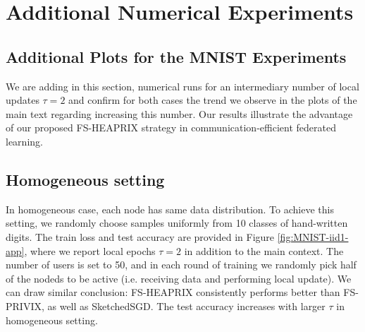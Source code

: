 \documentclass[twoside]{article}
\begin{document}
\section{Additional Numerical Experiments}

\subsection{Additional Plots for the MNIST Experiments}
We are adding in this section, numerical runs for an intermediary number of local updates $\tau =2$ and confirm for both cases the trend we observe in the plots of the main text regarding increasing this number. Our results illustrate the advantage of our proposed FS-HEAPRIX strategy in communication-efficient federated learning.

\subsection{Homogeneous setting}
In homogeneous case, each node has same data distribution. To achieve this setting, we randomly choose samples uniformly from 10 classes of hand-written digits. The train loss and test accuracy are provided in Figure \ref{fig:MNIST-iid1-app}, where we report local epochs $\tau=2$ in addition to the main context. The number of users is set to 50, and in each round of training we randomly pick half of the nodeds to be active (i.e. receiving data and performing local update). We can draw similar conclusion: FS-HEAPRIX consistently performs better than FS-PRIVIX, as well as SketchedSGD. The test accuracy increases with larger $\tau$ in homogeneous setting.
\end{document}

